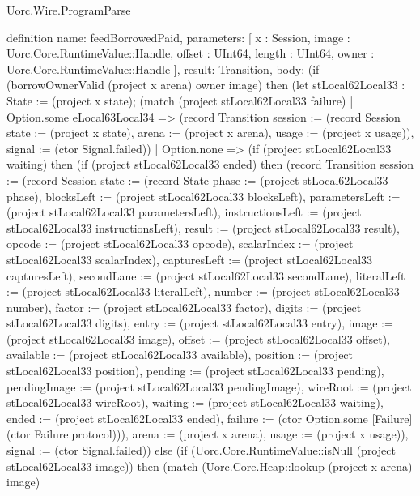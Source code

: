 \begin{lexlean}{Uorc.Wire.ProgramParse}
\begin{semanticmodule}
definition{
  name: feedBorrowedPaid,
  parameters: [
    x : Session,
    image : Uorc.Core.RuntimeValue::Handle,
    offset : UInt64,
    length : UInt64,
    owner : Uorc.Core.RuntimeValue::Handle
  ],
  result: Transition,
  body: (if (borrowOwnerValid (project x arena) owner image) then (let stLocal62Local33 : State := (project x state); (match (project stLocal62Local33 failure)
    | Option.some eLocal63Local34 => (record Transition {session := (record Session {state := (project x state), arena := (project x arena), usage := (project x usage)}), signal := (ctor Signal.failed)})
    | Option.none => (if (project stLocal62Local33 waiting) then (if (project stLocal62Local33 ended) then (record Transition {session := (record Session {state := (record State {phase := (project stLocal62Local33 phase), blocksLeft := (project stLocal62Local33 blocksLeft), parametersLeft := (project stLocal62Local33 parametersLeft), instructionsLeft := (project stLocal62Local33 instructionsLeft), result := (project stLocal62Local33 result), opcode := (project stLocal62Local33 opcode), scalarIndex := (project stLocal62Local33 scalarIndex), capturesLeft := (project stLocal62Local33 capturesLeft), secondLane := (project stLocal62Local33 secondLane), literalLeft := (project stLocal62Local33 literalLeft), number := (project stLocal62Local33 number), factor := (project stLocal62Local33 factor), digits := (project stLocal62Local33 digits), entry := (project stLocal62Local33 entry), image := (project stLocal62Local33 image), offset := (project stLocal62Local33 offset), available := (project stLocal62Local33 available), position := (project stLocal62Local33 position), pending := (project stLocal62Local33 pending), pendingImage := (project stLocal62Local33 pendingImage), wireRoot := (project stLocal62Local33 wireRoot), waiting := (project stLocal62Local33 waiting), ended := (project stLocal62Local33 ended), failure := (ctor Option.some [Failure] (ctor Failure.protocol))}), arena := (project x arena), usage := (project x usage)}), signal := (ctor Signal.failed)}) else (if (Uorc.Core.RuntimeValue::isNull (project stLocal62Local33 image)) then (match (Uorc.Core.Heap::lookup (project x arena) image)
}
\end{semanticmodule}
\end{lexlean}

